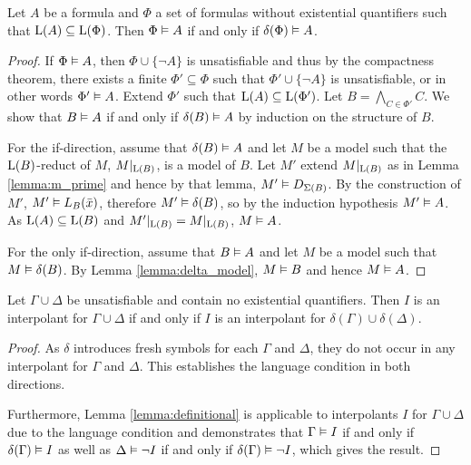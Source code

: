 \begin{lemma}
	\label{lemma:definitional}
	Let $A$ be a formula and $\Phi$ a set of formulas without existential quantifiers such that $\operatorname{L}(A) \subseteq \operatorname{L}(\Phi)$.
	Then $\Phi \vDash A$ if and only if $\delta(\Phi) \vDash A$.
\end{lemma}
\begin{proof}
	If $\Phi \vDash A$, then $\Phi \cup \{\lnot A\}$ is unsatisfiable and thus by the compactness theorem,
	there exists a finite $\Phi' \subseteq \Phi$ such that $\Phi' \cup \{\lnot A\}$ is unsatisfiable, or in other words $\Phi' \vDash A$.
	Extend $\Phi'$ such that $\operatorname{L}(A) \subseteq \operatorname{L}(\Phi')$.
	Let $B = \bigwedge_{C\in \Phi'} C$.
	We show that $B \vDash A$ if and only if $\delta(B) \vDash A$ by induction on the structure of\nolinebreak{} $B$.

	For the if-direction, assume that $\delta(B) \vDash A$ and let $M$ be a model 
	such that the $\operatorname{L}(B)$-reduct of $M$, $M|_{\operatorname{L}(B)}$, is a model of $B$.
	Let $M'$ extend $M|_{\operatorname{L}(B)}$ as in Lemma \ref{lemma:m_prime} and hence by that lemma, $M' \vDash D_{\Sigma(B)}$.
	By the construction of $M'$, $M' \vDash L_B(\bar x)$, therefore $M' \vDash \delta(B)$, so by the induction hypothesis $M' \vDash A$. 
	As $\operatorname{L}(A) \subseteq \operatorname{L}(B)$ and $M'|_{\operatorname{L}(B)} = M|_{\operatorname{L}(B)}$, $M \vDash A$.

	For the only if-direction, assume that $B \vDash A$ and let $M$ be a model such that $M\vDash \delta(B)$.  
	By Lemma \ref{lemma:delta_model}, $M\vDash B$ and hence $M\vDash A$.
\end{proof}


\begin{prop}
	\label{prop:delta_interpolant}
	Let $\Gamma \cup \Delta$ be unsatisfiable and contain no existential quantifiers.
	Then $I$ is an interpolant for \mbox{$\Gamma \cup \Delta$} if and only if 
	$I$ is an interpolant for $\delta(\Gamma) \cup \delta(\Delta)$.
\end{prop}
\begin{proof}
	As $\delta$ introduces fresh symbols for each $\Gamma$ and $\Delta$, they do not occur in any interpolant for $\Gamma$ and $\Delta$. 
	This establishes the language condition in both directions.

	Furthermore, Lemma \ref{lemma:definitional} is applicable to interpolants $I$ for $\Gamma \cup \Delta$ due to the language condition and demonstrates that
	$\Gamma \vDash I$ if and only if $\delta(\Gamma) \vDash I$
	as well as
	$\Delta \vDash \lnot I$ if and only if $\delta(\Gamma) \vDash \lnot I$, which gives the result.
\end{proof}

